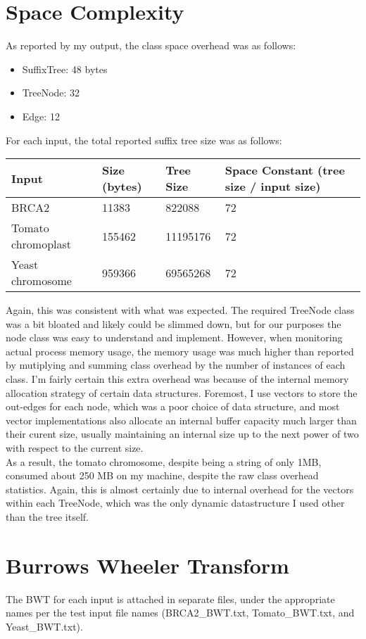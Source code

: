 \documentclass[12pt]{article}
\begin{document}
\section{Space Complexity}
As reported by my output, the class space overhead was as follows: \\
\begin{itemize}
\item SuffixTree: 48 bytes
\item TreeNode: 32
\item Edge: 12
\end{itemize}
\bigskip

For each input, the total reported suffix tree size was as follows: \\
\begin{tabular}{l l l l}
Input & Size (bytes) & Tree Size & Space Constant (tree size / input size) \\
\hline
BRCA2 & 11383 & 822088 & 72 \\
Tomato chromoplast & 155462 & 11195176 & 72 \\
Yeast chromosome & 959366 & 69565268 & 72 \\
\end{tabular}
\bigskip

Again, this was consistent with what was expected. The required TreeNode class was a bit bloated and likely could be slimmed down, but for our purposes the node class
was easy to understand and implement. However, when monitoring actual process memory usage, the memory usage was much higher than reported by mutiplying and summing
class overhead by the number of instances of each class. I'm fairly certain this extra overhead was because of the internal memory allocation strategy of certain data structures. Foremost,
I use vectors to store the out-edges for each node, which was a poor choice of data structure, and most vector implementations also allocate an internal buffer capacity much larger than their
curent size, usually maintaining an internal size up to the next power of two with respect to the current size. \\
As a result, the tomato chromosome, despite being a string of only 1MB, consumed about 250 MB on my machine, despite the raw class overhead statistics. Again, this is
almost certainly due to internal overhead for the vectors within each TreeNode, which was the only dynamic datastructure I used other than the tree itself. \\

\section{Burrows Wheeler Transform}
The BWT for each input is attached in separate files, under the appropriate names per the test input file names (BRCA2\_BWT.txt, Tomato\_BWT.txt, and Yeast\_BWT.txt).
\end{document}
